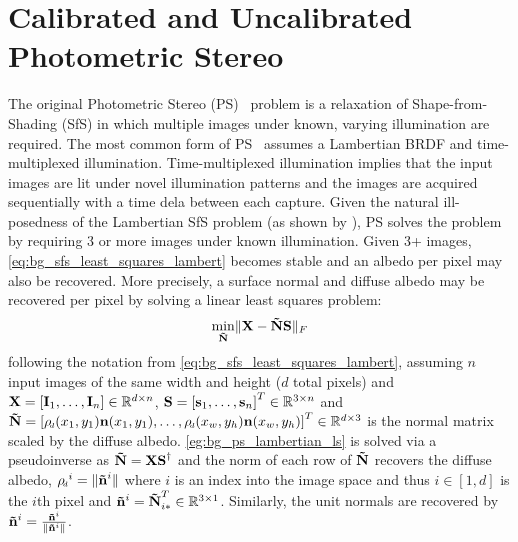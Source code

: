 \section{Calibrated and Uncalibrated Photometric Stereo}\label{sec:bg_ps}
The original Photometric Stereo (PS)~\cite{woodham1980photometric} problem
is a relaxation of Shape-from-Shading (SfS) in which multiple images under
known, varying illumination are required. The most common form of
PS~\cite{woodham1980photometric} assumes a Lambertian BRDF and time-multiplexed 
illumination. Time-multiplexed illumination implies that the input images
are lit under novel illumination patterns and the images are acquired 
sequentially with a time dela between each capture. Given the natural
ill-posedness of the Lambertian SfS problem (as shown by
), PS solves the problem by requiring
3 or more images under known illumination. Given 3+ images,
\cref{eq:bg_sfs_least_squares_lambert} becomes stable and an albedo per pixel 
may also be recovered. More precisely, a surface normal and diffuse albedo
may be recovered per pixel by solving a linear least squares problem:
\begin{equation}\label{eg:bg_ps_lambertian_ls}
	 \min_{\boldsymbol{\mathbf{\tilde{N}}}} \lVert \boldsymbol{\mathbf{X}} - \boldsymbol{\mathbf{\tilde{N}}} \boldsymbol{\mathbf{S}} \rVert_F
\end{equation}
following the notation from \cref{eq:bg_sfs_least_squares_lambert},
assuming $n$ input images of the same width and height ($d$ total pixels) and
$\boldsymbol{\mathbf{X}} = [\boldsymbol{\mathbf{I}}_1, \ldots, \boldsymbol{\mathbf{I}}_n] \in \mathbb{R}^{d \times n}$, 
$\boldsymbol{\mathbf{S}} = {[\boldsymbol{\mathbf{s}}_1, \ldots, \boldsymbol{\mathbf{s}}_n]}^T \in \mathbb{R}^{3 \times n}$ and
$\bb{\tilde{N}} = \nobreak {[\rho_{\smallsub{d}}(x_1, y_1)\bb{n}(x_1, y_1), \ldots, \rho_{\smallsub{d}}(x_w, y_h)\bb{n}(x_w, y_h)]}^T \in \R^{d \times 3}$ 
is the normal matrix scaled by the diffuse
albedo. \cref{eg:bg_ps_lambertian_ls} is solved via a
pseudoinverse as $\boldsymbol{\mathbf{\tilde{N}}} = \boldsymbol{\mathbf{X}} \boldsymbol{\mathbf{S}}^{\dagger}$ and the norm of each
row of $\boldsymbol{\mathbf{\tilde{N}}}$ recovers the diffuse albedo,
${\rho_{\smallsub{d}}}^i = \norm{\bb{\tilde{n}}^i}$ 
where $i$ is an index into the image space and thus $i \in [1, d]$ 
is the $i$th pixel and
$\boldsymbol{\mathbf{\tilde{n}}}^i = \boldsymbol{\mathbf{\tilde{N}}}_{i\ast}^T \in \mathbb{R}^{3 \times 1}$.
Similarly, the unit normals are recovered by
$\boldsymbol{\mathbf{\tilde{n}}}^i = \frac{\boldsymbol{\mathbf{\tilde{n}}}^i}{\lVert{} \boldsymbol{\mathbf{\tilde{n}}}^i \rVert}$.
